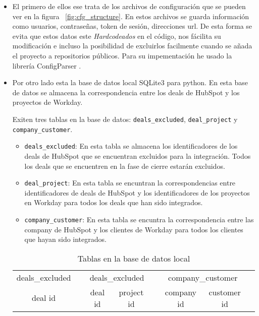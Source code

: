 \begin{itemize}[leftmargin=*]
\item El primero de ellos ese trata de los archivos de configuración que se pueden ver en la figura ~\ref{fig:cfg_structure}.
En estos archivos se guarda información como usuarios, contraseñas, token de sesión, direcciones url. 
De esta forma se evita que estos datos este \textit{Hardcodeados} en el código, nos fácilita su modificación e
incluso la posibilidad de excluirlos facilmente cuando se añada el proyecto a repositorios públicos.
Para su impementación he usado la librería ConfigParser \cite{ConfigParser}.





\item Por otro lado esta la base de datos local SQLite3 \cite{sqlite3} para python.
 En esta base de datos se almacena la correspondencia entre los deals de HubSpot y los proyectos de Workday.
 
 Exiten tres tablas en la base de datos: \verb|deals_excluded|, \verb|deal_project| y \verb|company_customer|.
 
 
 \begin{itemize}
	\item \verb|deals_excluded|: En esta tabla se almacena los identificadores de los deals de HubSpot 
	que se encuentran excluidos para la integración. Todos los deals que se encuentren en la fase de
	cierre estarán excluidos.
	\item \verb|deal_project|: En esta tabla se encuntran la correspondencias entre identificadores 
	de deals de HubSpot y los identificadores de los proyectos en Workday para todos los deals que han sido integrados.
	\item \verb|company_customer|: En esta tabla se encuntra la correspondencia entre las company de HubSpot y los clientes de Workday
	para todos los clientes que hayan sido integrados.
 \end{itemize}
 
\begin{table}
		\centering
		\begin{tabular}{
		|c|c@{\hskip 1cm} 
		|c|c|c@{\hskip 1cm} 
		|c|c|c@{\hskip 1cm}
		}
		\cline{1-1}\cline{3-4}\cline{6-7}
		deals\_excluded && \multicolumn{2}{c|}{deals\_excluded} && \multicolumn{2}{c|}{company\_customer} \\
	\cline{1-1}\cline{3-4}\cline{6-7}
	deal id && deal id & project id && company id & customer id \\
	\cline{1-1}\cline{3-4}\cline{6-7}
	\end{tabular}
	\caption{Tablas en la base de datos local}
	\label{tab:tables}
\end{table}

\end{itemize}




